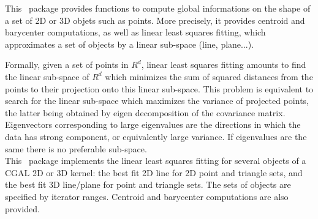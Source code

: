 This \cgal\ package provides functions to compute global informations
on the shape of a set of 2D or 3D objets such as points.
More precisely, it provides centroid and barycenter computations,
as well as linear least squares fitting, which approximates a set
of objects by a linear sub-space (line, plane...).

Formally, given a set of points in $R^d$, linear least squares fitting amounts
to find the linear sub-space of $R^d$ which minimizes the sum of squared
distances from the points to their projection onto this linear sub-space. This
problem is equivalent to search for the linear sub-space which maximizes the
variance of projected points, the latter being obtained by eigen decomposition
of the covariance matrix. Eigenvectors corresponding to large eigenvalues are
the directions in which the data has strong component, or equivalently large
variance. If eigenvalues are the same there is no preferable sub-space.\\

This \cgal\ package implements the linear least squares fitting for
several objects of a CGAL 2D or 3D kernel: the best fit 2D line for 2D
point and triangle sets, and the best fit 3D line/plane for point and
triangle sets.  The sets of objects are specified by iterator ranges.
Centroid and barycenter computations are also provided.


